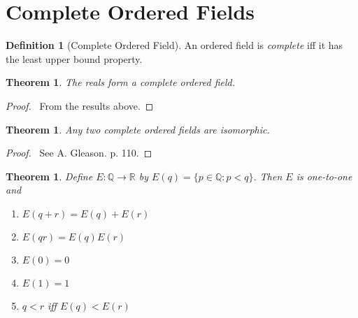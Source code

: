 \documentclass{article}
\let\qed\relax
\newtheorem{theorem}[axiom]{Theorem}
\theoremstyle{definition}
\newtheorem{definition}[axiom]{Definition}
\begin{document}
    \section{Complete Ordered Fields}

    \begin{definition}[Complete Ordered Field]
        An ordered field is \emph{complete} iff it has the least upper bound property.
    \end{definition}

    \begin{theorem}
        The reals form a complete ordered field.
    \end{theorem}

    \begin{proof}
        \pf\ From the results above. \qed
    \end{proof}

    \begin{theorem}
        Any two complete ordered fields are isomorphic.
    \end{theorem}

    \begin{proof}
        \pf\ See A. Gleason.  p. 110. \qed
    \end{proof}

    \begin{theorem}
        Define $E : \mathbb{Q} \rightarrow \mathbb{R}$ by $E(q) = \{ p \in \mathbb{Q} : p < q \}$.
        Then $E$ is one-to-one and
        \begin{enumerate}
            \item $E(q+r) = E(q) + E(r)$
            \item $E(qr) = E(q) E(r)$
            \item $E(0) = 0$
            \item $E(1) = 1$
            \item $q < r$ iff $E(q) < E(r)$
        \end{enumerate}
    \end{theorem}
\end{document}
